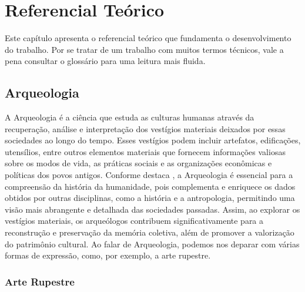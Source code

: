     \chapter{Referencial Teórico}
    \label{Referencial_Teorico}
    Este capítulo apresenta o referencial teórico que fundamenta o desenvolvimento do trabalho. Por se tratar de um trabalho com muitos termos técnicos, vale a pena consultar o glossário para uma leitura mais fluida. 
    
    \section{Arqueologia}%
    A Arqueologia é a ciência que estuda as culturas humanas através da recuperação, análise e interpretação dos vestígios materiais deixados por essas sociedades ao longo do tempo. Esses vestígios podem incluir artefatos, edificações, utensílios, entre outros elementos materiais que fornecem informações valiosas sobre os modos de vida, as práticas sociais e as organizações econômicas e políticas dos povos antigos. Conforme destaca \cite{funari2024arqueologia}, a Arqueologia é essencial para a compreensão da história da humanidade, pois complementa e enriquece os dados obtidos por outras disciplinas, como a história e a antropologia, permitindo uma visão mais abrangente e detalhada das sociedades passadas. Assim, ao explorar os vestígios materiais, os arqueólogos contribuem significativamente para a reconstrução e preservação da memória coletiva, além de promover a valorização do patrimônio cultural.
    Ao falar de Arqueologia, podemos nos deparar com várias formas de expressão, como, por exemplo, a arte rupestre.
    \subsection{Arte Rupestre}
    
    
    
